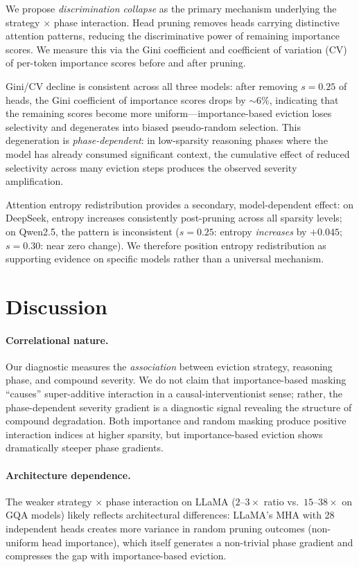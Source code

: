 \documentclass[11pt,a4paper]{article}
\begin{document}
We propose \emph{discrimination collapse} as the primary mechanism underlying the strategy $\times$ phase interaction.
Head pruning removes heads carrying distinctive attention patterns, reducing the discriminative power of remaining importance scores.
We measure this via the Gini coefficient and coefficient of variation (CV) of per-token importance scores before and after pruning.

Gini/CV decline is consistent across all three models: after removing $s = 0.25$ of heads, the Gini coefficient of importance scores drops by ${\sim}6\%$, indicating that the remaining scores become more uniform---importance-based eviction loses selectivity and degenerates into biased pseudo-random selection.
This degeneration is \emph{phase-dependent}: in low-sparsity reasoning phases where the model has already consumed significant context, the cumulative effect of reduced selectivity across many eviction steps produces the observed severity amplification.

Attention entropy redistribution provides a secondary, model-dependent effect: on DeepSeek, entropy increases consistently post-pruning across all sparsity levels; on Qwen2.5, the pattern is inconsistent ($s\!=\!0.25$: entropy \emph{increases} by $+0.045$; $s\!=\!0.30$: near zero change).
We therefore position entropy redistribution as supporting evidence on specific models rather than a universal mechanism.

\section{Discussion}
\label{sec:discussion}

\paragraph{Correlational nature.}
Our diagnostic measures the \emph{association} between eviction strategy, reasoning phase, and compound severity.
We do not claim that importance-based masking ``causes'' super-additive interaction in a causal-interventionist sense; rather, the phase-dependent severity gradient is a diagnostic signal revealing the structure of compound degradation.
Both importance and random masking produce positive interaction indices at higher sparsity, but importance-based eviction shows dramatically steeper phase gradients.

\paragraph{Architecture dependence.}
The weaker strategy $\times$ phase interaction on LLaMA ($2$--$3\times$ ratio vs.\ $15$--$38\times$ on GQA models) likely reflects architectural differences: LLaMA's MHA with 28 independent heads creates more variance in random pruning outcomes (non-uniform head importance), which itself generates a non-trivial phase gradient and compresses the gap with importance-based eviction.
\end{document}
